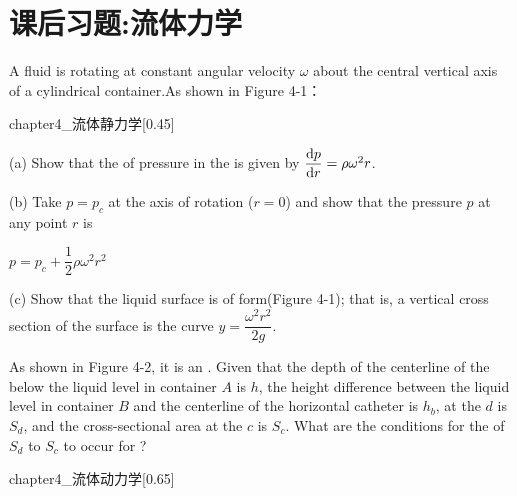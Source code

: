 \section{课后习题:流体力学}
\begin{example}
    A fluid is rotating at constant angular velocity $\omega$ about the central vertical axis of a cylindrical container.As shown in Figure 4-1：
    \begin{singlefigure}[流体静力学]{chapter4_流体静力学}[0.45]
    \end{singlefigure}

    (a) Show that the  of pressure in the  is given by $\dfrac{\dif p}{\dif r}=\rho \omega^2 r$.

    (b) Take $p=p_c$ at the axis of rotation ($r=0$) and show that the pressure $p$ at any point $r$ is
    \begin{center}
        $p=p_c+\dfrac{1}{2}\rho\omega^2 r^2$
    \end{center}

    (c) Show that the liquid surface is of  form(Figure 4-1); that is, a vertical cross section of the surface is the curve $y=\dfrac{\omega^2 r^2}{2g}$.
\end{example}
\begin{example}
    As shown in Figure 4-2, it is an . Given that the depth of the centerline of the  below the liquid level in container $A$ is $h$,
    the height difference between the liquid level in container $B$ and the centerline of the horizontal catheter is $h_b$,  at the  $d$ is $S_d$,
    and the cross-sectional area at the  $c$ is $S_c$. What are the conditions for the  of $S_d$ to $S_c$ to occur for ?
    \begin{singlefigure}[流体动力学]{chapter4_流体动力学}[0.65]
    \end{singlefigure}
\end{example}